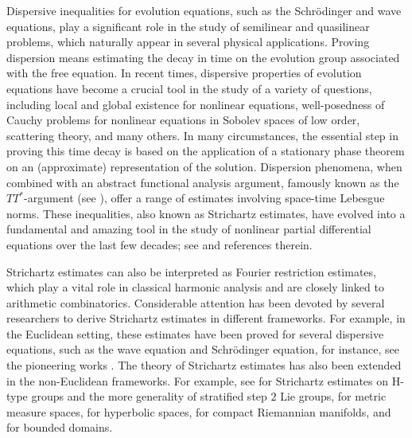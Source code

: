 \documentclass[a4paper,11pt, reqno]{amsart}
\numberwithin{equation}{section}
\theoremstyle{plain}
\theoremstyle{definition}
\theoremstyle{remark}
\begin{document}
Dispersive inequalities for evolution equations, such as the Schr\"odinger and wave equations, play a significant role in the study of semilinear and quasilinear problems, which naturally appear in several physical applications. Proving dispersion means estimating the decay in time on the evolution group associated with the free equation.  In recent times, dispersive properties of evolution equations have become a crucial tool in the study of a variety of questions, including local and global existence for nonlinear equations, well-posedness of Cauchy problems
for nonlinear equations in Sobolev spaces of low order, scattering theory, and many others. In many circumstances, the essential step in proving this time decay is based on the application of a stationary phase theorem on an (approximate) representation of the solution.  Dispersion phenomena, when combined with an abstract functional analysis argument, famously known as the $TT^*$-argument (see \cite{KT}), offer a range of estimates involving space-time Lebesgue norms. These inequalities, also known as Strichartz estimates, have evolved into a fundamental and amazing tool in the study of nonlinear partial differential equations over the last few decades; see \cite{Bahouri-app} and references therein.

 Strichartz estimates can also be interpreted as Fourier restriction estimates, which play a vital role in classical harmonic analysis and are closely linked to arithmetic combinatorics. Considerable attention has been devoted by several researchers to derive Strichartz estimates in different frameworks. For example, in the Euclidean setting,  these estimates have been proved for several dispersive equations, such as the wave equation and Schr\"{o}dinger equation, for instance, see the pioneering works \cite{GV, KT, Str}. The theory of Strichartz estimates has also been extended in the non-Euclidean frameworks. 
For example, see \cite{Song-Tan, BGX2000, H2005, FMV1, FV,  LS2014, SZ, Song2026, Song2016,  BKG, BBG2021, SY2023} for Strichartz estimates on H-type groups and the more generality of stratified step $2$  Lie groups, \cite{BDDM2019, DPR2010, Feng-Song, FSW, NR2005, R2008, S2013, Mejjaoli2008-1, Mejjaoli2009, Mejjaoli2013, Ben said, Ratna3, MS, FMSW} for metric measure spaces, 
\cite{AP2009, AP2014, APV2012} for hyperbolic spaces, \cite{B1993, BGT2004} for compact Riemannian manifolds,  and \cite{ILP2014} for bounded domains.
\end{document}
